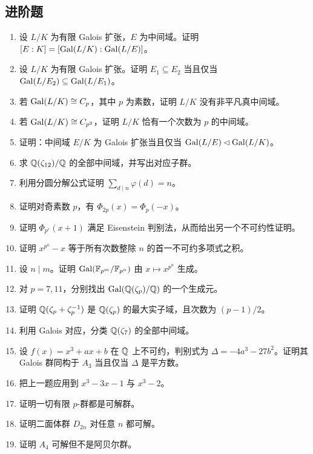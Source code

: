 \subsection*{进阶题}

\begin{enumerate}[resume, label=\textbf{习题12.\arabic*.}, leftmargin=*, itemsep=0.75em]
\item \medium 设 $L/K$ 为有限 Galois 扩张，$E$ 为中间域。证明 $[E:K]=[\mathrm{Gal}(L/K):\mathrm{Gal}(L/E)]$。
\item \medium 设 $L/K$ 为有限 Galois 扩张。证明 $E_1\subseteq E_2$ 当且仅当 $\mathrm{Gal}(L/E_2)\subseteq\mathrm{Gal}(L/E_1)$。
\item \medium 若 $\mathrm{Gal}(L/K)\cong C_p$，其中 $p$ 为素数，证明 $L/K$ 没有非平凡真中间域。
\item \medium 若 $\mathrm{Gal}(L/K)\cong C_{p^2}$，证明 $L/K$ 恰有一个次数为 $p$ 的中间域。
\item \medium 证明：中间域 $E/K$ 为 Galois 扩张当且仅当 $\mathrm{Gal}(L/E)\lhd\mathrm{Gal}(L/K)$。
\item \medium 求 $\mathbb{Q}(\zeta_{12})/\mathbb{Q}$ 的全部中间域，并写出对应子群。
\item \medium 利用分圆分解公式证明 $\sum_{d\mid n}\varphi(d)=n$。
\item \medium 证明对奇素数 $p$，有 $\Phi_{2p}(x)=\Phi_p(-x)$。
\item \medium 证明 $\Phi_{p^r}(x+1)$ 满足 Eisenstein 判别法，从而给出另一个不可约性证明。
\item \medium 证明 $x^{p^n}-x$ 等于所有次数整除 $n$ 的首一不可约多项式之积。
\item \medium 设 $n\mid m$。证明 $\mathrm{Gal}(\mathbb{F}_{p^m}/\mathbb{F}_{p^n})$ 由 $x\mapsto x^{p^n}$ 生成。
\item \medium 对 $p=7,11$，分别找出 $\mathrm{Gal}(\mathbb{Q}(\zeta_p)/\mathbb{Q})$ 的一个生成元。
\item \medium 证明 $\mathbb{Q}(\zeta_p+\zeta_p^{-1})$ 是 $\mathbb{Q}(\zeta_p)$ 的最大实子域，且次数为 $(p-1)/2$。
\item \medium 利用 Galois 对应，分类 $\mathbb{Q}(\zeta_7)$ 的全部中间域。
\item \medium 设 $f(x)=x^3+ax+b$ 在 $\mathbb{Q}$ 上不可约，判别式为 $\Delta=-4a^3-27b^2$。证明其 Galois 群同构于 $A_3$ 当且仅当 $\Delta$ 是平方数。
\item \medium 把上一题应用到 $x^3-3x-1$ 与 $x^3-2$。
\item \medium 证明一切有限 $p$-群都是可解群。
\item \medium 证明二面体群 $D_{2n}$ 对任意 $n$ 都可解。
\item \medium 证明 $A_4$ 可解但不是阿贝尔群。

\end{enumerate}
